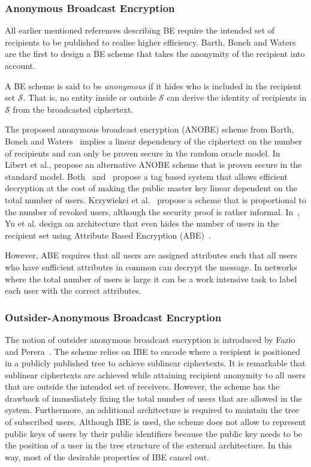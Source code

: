 \subsubsection{Anonymous Broadcast Encryption}
\label{sec:anobe}
All earlier mentioned references describing BE require the intended set of recipients to be published to realise higher efficiency. Barth, Boneh and Waters~\cite{art:BarthBW06} are the first to design a BE scheme that takes the anonymity of the recipient into account.
\begin{defn}[Anonymity]
\label{def:anonymity}
 A BE scheme is said to be \textit{anonymous} if it hides who is included in the recipient set $\mathcal{S}$. That is, no entity inside or outside $\mathcal{S}$ can derive the identity of recipients in $\mathcal{S}$ from the broadcasted ciphertext.
\end{defn}

The proposed anonymous broadcast encryption (ANOBE) scheme  from Barth, Boneh and Waters~\cite{art:BarthBW06} implies a linear dependency of the ciphertext on the number of recipients and can only be proven secure in the random oracle model. In~\cite{art:LibertPQ12} Libert et al., propose an alternative ANOBE scheme that is proven secure in the standard model. Both~\cite{art:BarthBW06} and~\cite{art:LibertPQ12} propose a tag based system that allows efficient decryption at the cost of making the public master key linear dependent on the total number of users. Krzywiekci et al.~\cite{art:KrzywieckiKK06} propose a scheme that is proportional to the number of revoked users, although the security proof is rather informal. In~\cite{art:YuRL10}, Yu et al. design an architecture that even hides the number of users in the recipient set using Attribute Based Encryption (ABE)~\cite{art:SahaiW04}.

However, ABE requires that all users are assigned attributes such that all users who have sufficient attributes in common can decrypt the message. In networks where the total number of users is large it can be a work intensive task to label each user with the correct attributes.

\subsubsection{Outsider-Anonymous Broadcast Encryption}
The notion of outsider anonymous broadcast encryption is introduced by Fazio and Perera~\cite{art:FazioP12}. The scheme relies on IBE to encode where a recipient is positioned in a publicly published tree to achieve sublinear ciphertexts. It is remarkable that sublinear ciphertexts are achieved while attaining recipient anonymity to all users that are outside the intended set of receivers. However, the scheme has the drawback of immediately fixing the total number of users that are allowed in the system. Furthermore, an additional architecture is required to maintain the tree of subscribed users. Although IBE is used, the scheme does not allow to represent public keys of users by their public identifiers because the public key needs to be the position of a user in the tree structure of the external architecture. In this way, most of the desirable properties of IBE cancel out.

